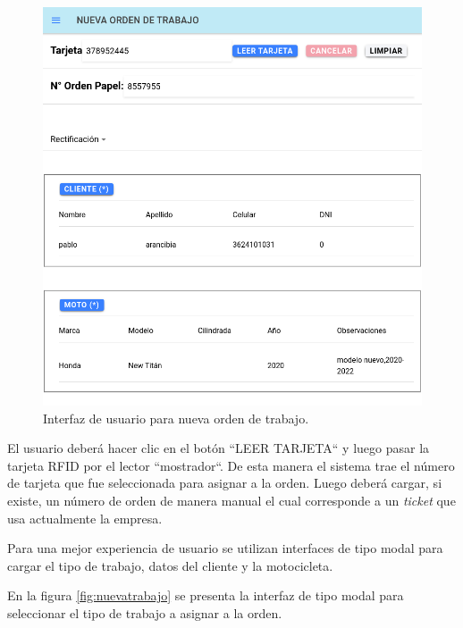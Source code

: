 \begin{figure}[H]
	\centering
	\includegraphics[scale=.40]{./Figures/nueva-full-1.png}
	\caption{Interfaz de usuario para nueva orden de trabajo.}
	\label{fig:nuevafull1}
\end{figure}


El usuario deberá hacer clic en el botón ``LEER TARJETA`` y luego pasar la tarjeta RFID por el lector ``mostrador``. De esta manera el sistema trae el número de tarjeta que fue seleccionada para asignar a la orden. Luego deberá cargar, si existe, un número de orden de manera manual el cual corresponde a un \textit{ticket} que usa actualmente la empresa.

Para una mejor experiencia de usuario se utilizan interfaces de tipo modal para cargar el tipo de trabajo, datos del cliente y la motocicleta.

En la figura \ref{fig:nuevatrabajo} se presenta la interfaz de tipo modal para seleccionar el tipo de trabajo a asignar a la orden.

